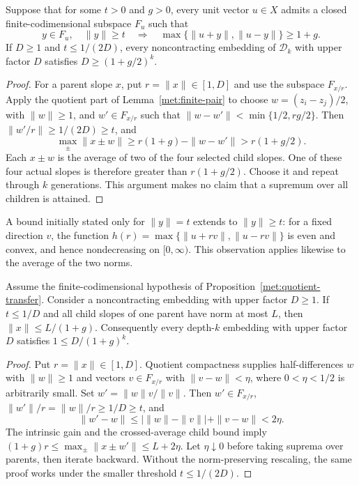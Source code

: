 \begin{proposition}\label{met:quotient-transfer}
Suppose that for some $t>0$ and $g>0$, every unit vector $u\in X$ admits
a closed finite-codimensional subspace $F_u$ such that
\[
 y\in F_u,\quad\|y\|\ge t
 \quad\Longrightarrow\quad
 \max\{\|u+y\|,\|u-y\|\}\ge1+g.
\]
If $D\ge1$ and $t\le1/(2D)$, every noncontracting embedding of
$\mathcal D_k$ with upper factor $D$ satisfies $D\ge(1+g/2)^k$.
\end{proposition}
\begin{proof}
For a parent slope $x$, put $r=\|x\|\in[1,D]$ and use the subspace
$F_{x/r}$. Apply the quotient part of Lemma~\ref{met:finite-pair} to
choose $w=(z_i-z_j)/2$, with $\|w\|\ge1$, and $w'\in F_{x/r}$
such that $\|w-w'\|<\min\{1/2,rg/2\}$. Then
$\|w'/r\|\ge1/(2D)\ge t$, and
\[
 \max_\pm\|x\pm w\|\ge r(1+g)-\|w-w'\|>r(1+g/2).
\]
Each $x\pm w$ is the average of two of the four selected child slopes.
One of these four actual slopes is therefore greater than $r(1+g/2)$.
Choose it and repeat through $k$ generations. This argument makes no
claim that a supremum over all children is attained.
\end{proof}

A bound initially stated only for $\|y\|=t$ extends to $\|y\|\ge t$:
for a fixed direction $v$, the function
$h(r)=\max\{\|u+rv\|,\|u-rv\|\}$ is even and convex, and hence
nondecreasing on $[0,\infty)$. This observation applies likewise to the
average of the two norms.

\begin{proposition}
\label{met:full-gain}
Assume the finite-codimensional hypothesis of
Proposition~\ref{met:quotient-transfer}. Consider a noncontracting embedding
with upper factor $D\ge1$. If $t\le1/D$ and all child
slopes of one parent have norm at most $L$, then
$\|x\|\le L/(1+g)$. Consequently every depth-$k$ embedding with
upper factor $D$ satisfies $1\le D/(1+g)^k$.
\end{proposition}
\begin{proof}
Put $r=\|x\|\in[1,D]$. Quotient compactness supplies half-differences
$w$ with $\|w\|\ge1$ and vectors $v\in F_{x/r}$ with
$\|v-w\|<\eta$, where $0<\eta<1/2$ is arbitrarily small.
Set $w'=\|w\|v/\|v\|$. Then $w'\in F_{x/r}$,
$\|w'\|/r=\|w\|/r\ge1/D\ge t$, and
\[
 \|w'-w\|\le \bigl|\|w\|-\|v\|\bigr|+\|v-w\|<2\eta.
\]
The intrinsic gain and the crossed-average child bound imply
$(1+g)r\le\max_\pm\|x\pm w'\|\le L+2\eta$.
Let $\eta\downarrow0$ before taking suprema over parents, then
iterate backward. Without the norm-preserving rescaling, the same
proof works under the smaller threshold $t\le1/(2D)$.
\end{proof}

